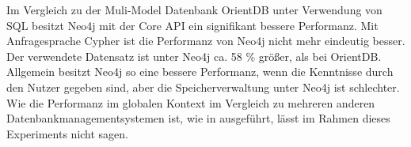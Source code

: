 Im Vergleich zu der Muli-Model Datenbank OrientDB unter Verwendung von SQL besitzt Neo4j mit der Core API ein signifikant bessere Performanz. Mit  Anfragesprache Cypher ist die Performanz von Neo4j nicht mehr eindeutig besser. Der verwendete Datensatz ist unter Neo4j ca. 58 \% größer, als bei OrientDB. Allgemein besitzt Neo4j so eine bessere Performanz, wenn die Kenntnisse durch den Nutzer gegeben sind, aber die Speicherverwaltung unter Neo4j ist schlechter. Wie die Performanz im globalen Kontext im Vergleich zu mehreren anderen Datenbankmanagementsystemen ist, wie in \parencite{jouili2013empirical} ausgeführt,  lässt im Rahmen dieses Experiments nicht sagen. 

